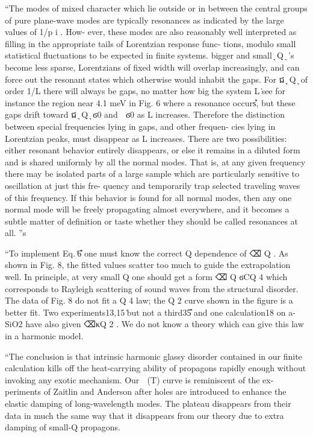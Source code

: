 \documentclass[aps,prb,twocolumn,superscriptaddress,footinbib,amsmath,amssymb,floatfix]{revtex4}
\begin{document}
{``The
modes of mixed character which lie outside or in between
the central groups of pure plane-wave modes are typically
resonances as indicated by the large values of 1/p i .
How-
ever, these modes are also reasonably well interpreted as
filling in the appropriate tails of Lorentzian response func-
tions, modulo small statistical fluctuations to be expected in
finite systems.
bigger and small ͉ Q ͉ ’s become less sparse, Lorentzians of
fixed width will overlap increasingly, and can force out the
resonant states which otherwise would inhabit the gaps. For
ជ
͉ Q ͉ of order 1/L there will always be gaps, no matter how
big the system L ͑see for instance the region near 4.1 meV in
Fig. 6 where a resonance occurs͒, but these gaps drift toward
ជ
͉ Q ͉ ϭ0 and ␻ ϭ0 as L increases. Therefore the distinction
between special frequencies lying in gaps, and other frequen-
cies lying in Lorentzian peaks, must disappear as L increases.
There are two possibilities: either resonant behavior entirely
disappears, or else it remains in a diluted form and is shared
uniformly by all the normal modes. That is, at any given
frequency there may be isolated parts of a large sample
which are particularly sensitive to oscillation at just this fre-
quency and temporarily trap selected traveling waves of this
frequency. If this behavior is found for all normal modes,
then any one normal mode will be freely propagating almost
everywhere, and it becomes a subtle matter of definition or
taste whether they should be called resonances at all.
''s



``To implement Eq. ͑6͒ one must know the
correct Q dependence of ⌫ Q . As shown in Fig. 8, the fitted
values scatter too much to guide the extrapolation well. In
principle, at very small Q one should get a form ⌫ Q ϭCQ 4
which corresponds to Rayleigh scattering of sound waves
from the structural disorder. The data of Fig. 8 do not fit a
Q 4 law; the Q 2 curve shown in the figure is a better fit. Two
experiments13,15 ͑but not a third35͒ and one calculation18 on
a-SiO2 have also given ⌫κQ 2 . We do not know a theory
which can give this law in a harmonic model.


``The conclusion is that intrinsic harmonic glassy disorder
contained in our finite calculation kills off the heat-carrying
ability of propagons rapidly enough without invoking any
exotic mechanism. Our ␬ (T) curve is reminiscent of the ex-
periments of Zaitlin and Anderson after holes are introduced
to enhance the elastic damping of long-wavelength modes.
The plateau disappears from their data in much the same way
that it disappears from our theory due to extra damping of
small-Q propagons.

}
\end{document}
